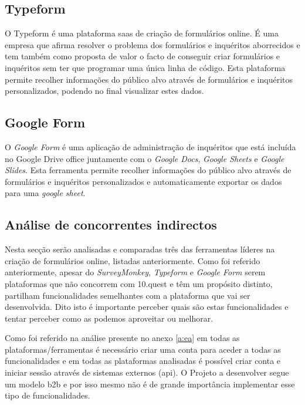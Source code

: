 \subsection{Typeform}
\label{typeformM}

O Typeform é uma plataforma \acrshort{saas} de criação de formulários online. É uma empresa que afirma resolver o problema dos formulários e inquéritos aborrecidos e tem também como proposta de valor o facto de conseguir criar formulários e inquéritos sem ter que programar uma única linha de código. Esta plataforma permite recolher informações do público alvo através de formulários e inquéritos personalizados, podendo no final visualizar estes dados. 


\subsection{Google Form}
\label{googleformM}

O \textit{Google Form} é uma aplicação de administração de inquéritos que está incluída no Google Drive office juntamente com o \textit{Google Docs}\cite{gdocs}, \textit{Google Sheets} e \textit{Google Slides}\cite{gslides}. Esta ferramenta permite recolher informações do público alvo através de formulários e inquéritos personalizados e automaticamente exportar os dados para uma \textit{google sheet}.

\subsection{Análise de concorrentes indirectos}

Nesta secção serão analisadas e comparadas três das ferramentas líderes na criação de formulários online, listadas anteriormente. Como foi referido anteriormente, apesar do \textit{SurveyMonkey}, \textit{Typeform} e \textit{Google Form} serem plataformas que não concorrem com 10.quest e têm um propósito distinto, partilham funcionalidades semelhantes com a plataforma que vai ser desenvolvida. Dito isto é importante perceber quais são estas funcionalidades e tentar perceber como as podemos aproveitar ou melhorar.

Como foi referido na análise presente no anexo \ref{a:ea} em todas as plataformas/ferramentas é necessário criar uma conta para aceder a todas as funcionalidades e em todas as plataformas analisadas é possível criar conta e iniciar sessão através de sistemas externos (\acrshort{api}). O Projeto a desenvolver segue um modelo \gls{b2b} e por isso mesmo não é de grande importância implementar esse tipo de funcionalidades.

